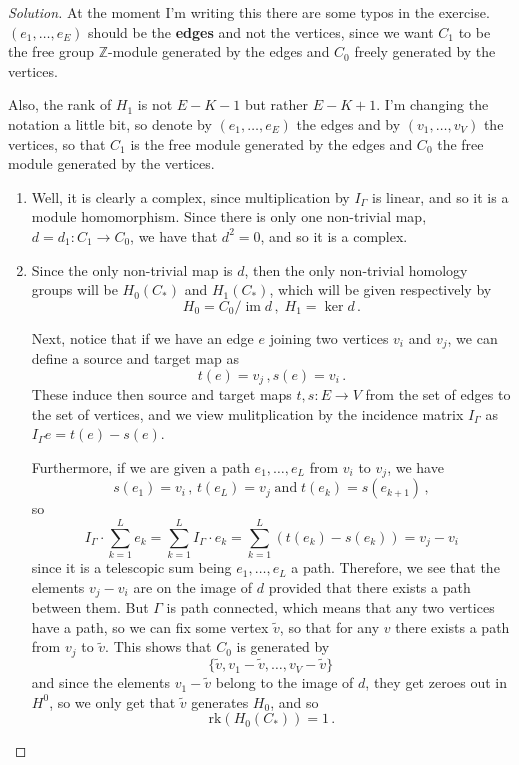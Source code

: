 \documentclass[a4paper,12pt]{article}
\newenvironment{solution}
  {\renewcommand\qedsymbol{$\blacksquare$}\begin{proof}[Solution]}
  {\end{proof}}
\DeclareMathOperator{\im}{im}
\theoremstyle{definition}
\begin{document}
\begin{solution}
At the moment I'm writing this there are some typos in the exercise. $(e_1, \dots , e_E)$ should be the \textbf{edges} and not the vertices, since we want $C_1$ to be the free group $\mathbb{Z}$-module generated by the edges and $C_0$ freely generated by the vertices. 

Also, the rank of $H_1$ is not $E - K -1$ but rather $E - K +1$. I'm changing the notation a little bit, so denote by $(e_1, \dots , e_E)$ the edges and by $(v_1, \dots , v_V)$ the vertices, so that $C_1$ is the free module generated by the edges and $C_0$ the free module generated by the vertices. 

\begin{enumerate}[label = \alph*)]
    \item Well, it is clearly a complex, since multiplication by $I_{\Gamma}$ is linear, and so it is a module homomorphism. Since there is only one non-trivial map, $d = d_1 \colon C_1 \to C_0$, we have that $d^2 = 0$, and so it is a complex. 
    \item Since the only non-trivial map is $d$, then the only non-trivial homology groups will be $H_0(C_*)$ and $H_1(C_*)$, which will be given respectively by 
    $$H_0 = C_0/\im d \, , \; H_1 = \ker d \, .$$
    
    Next, notice that if we have an edge $e$ joining two vertices $v_i$ and $v_j$, we can define a source and target map as 
    $$t(e) = v_j \, , s(e) = v_i \, .$$
    These induce then source and target maps $t, s \colon E \to V$ from the set of edges to the set of vertices, and we view mulitplication by the incidence matrix $I_{\Gamma}$ as $I_{\Gamma} e = t(e) - s(e)$. 
    
    Furthermore, if we are given a path $e_1, \dots , e_L$ from $v_i$ to $v_j$, we have 
    $$s(e_1) = v_i \, , \, t(e_L) = v_j \; \text{and} \; t(e_k) = s(e_{k+1}) \, ,$$
    so 
    $$I_{\Gamma} \cdot \sum_{k=1}^L e_k = \sum_{k=1}^L I_{\Gamma} \cdot e_k = \sum_{k=1}^L ( t(e_k) - s(e_k)) = v_j - v_i$$
    since it is a telescopic sum being $e_1, \dots , e_L$ a path. Therefore, we see that the elements $v_j - v_i$ are on the image of $d$ provided that there exists a path between them. But $\Gamma$ is path connected, which means that any two vertices have a path, so we can fix some vertex $\tilde{v}$, so that for any $v$ there exists a path from $v_j$ to $\tilde{v}$. This shows that $C_0$ is generated by 
    $$\{ \tilde{v}, v_1 - \tilde{v} , \dots , v_V - \tilde{v} \} \,$$
    and since the elements $v_1 - \tilde{v}$ belong to the image of $d$, they get zeroes out in $H^0$, so we only get that $\tilde{v}$ generates $H_0$, and so 
    $$\text{rk}(H_0(C_*)) = 1 \, .$$
    

\end{enumerate}
\end{solution}
\end{document}
